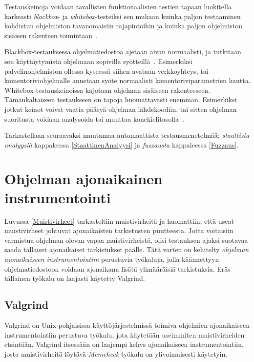 
Testauskeinoja voidaan tavallisten funktionaalisten testien tapaan luokitella karkeasti
\emph{blackbox}- ja \emph{whitebox}-testeiksi sen mukaan kuinka paljon
testaaminen kohdistuu ohjelmiston tavanomaisiin rajapintoihin ja kuinka paljon
ohjelmiston sisäisen rakenteen toimintaan~\cite{OuluBrowser}.

Blackbox-testauksessa ohjelmatiedostoa ajetaan aivan normaalisti,
ja tutkitaan sen käyttäytymistä ohjelmaan sopivilla syötteillä~\cite{OuluBrowser}.
Esimerkiksi palvelinohjelmiston ollessa kyseessä siihen avataan verkkoyhteys,
tai komentoriviohjelmalle annetaan syöte normaalisti komentoriviparametrien kautta.
Whitebox-testauskeinoissa kajotaan ohjelman sisäiseen rakenteeseen.
Tä\-män\-kal\-tai\-seen testaukseen on tapoja huomattavasti enemmän.
Esimerkiksi jotkut keinot voivat vaatia pääsyä ohjelman lähdekoodiin,
tai sitten ohjelman suoritusta voidaan analysoida tai muuttaa konekielitasolla~\cite{OuluBrowser}.

Tarkastellaan seuraavaksi muutamaa automaattista testausmenetelmää: \emph{staattista analyysiä}
kappaleessa \ref{StaattinenAnalyysi} ja \emph{fuzzausta} kappaleessa \ref{Fuzzaus}.

\section{Ohjelman ajonaikainen instrumentointi}
Luvussa \ref{Muistivirheet} tarkasteltiin muistivirheitä ja huomattiin,
että useat muistivirheet johtuvat ajonaikaisten tarkistusten puutteesta.
Jotta voitaisiin varmistua ohjelman olevan vapaa muistivirheistä,
olisi testauksen ajaksi suotavaa saada tällaiset ajonaikaiset tarkistukset päälle.
Tätä varten on kehitelty \emph{ohjelman ajonaikaiseen instrumentointiin} perustuvia työkaluja,
jolla käännettyyn ohjelmatiedostoon voidaan ajonaikana lisätä ylimääräisiä tarkistuksia.
Eräs tällainen työkalu on laajasti käytetty Valgrind.

\subsection{Valgrind}

Valgrind on Unix-pohjaisissa käyttöjärjestelmissä toimiva ohjelmien ajonaikaiseen instrumentointiin
perustuva työkalu, jota käytetään useimmiten muistivirheiden etsintään.
Valgrind itsessään on laajempi kehys ajonaikaiseen instrumentointiin,
josta muistivirheitä löytävä \emph{Memcheck}-työkalu on ylivoimaisesti käytetyin.

